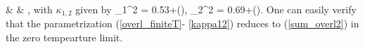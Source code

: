      & & \cdot {}
              \nonumber ,
\ee
with $\kappa_{1,2}$ given by
\be
\label{kappa12}
   \kappa_1^2 = 
   {0.53+\left(\right)},
   \hspace{0.5cm}
   \kappa_2^2 = 
   {0.69+\left(\right)}.
\ee
One can easily verify that the parametrization (\ref{overl_finiteT}-
\ref{kappa12}) reduces to (\ref{sum_overl2}) in the zero tempearture
limit.



\newpage

